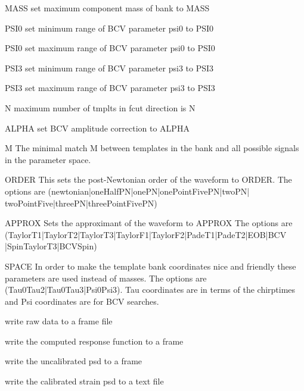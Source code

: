 \begin{entry}
\item[\option{--maximum-mass} \textsc{MASS}] set maximum component mass of bank to MASS
\item[\option{--minimum-psi0} \textsc{ PSI0}] set minimum range of BCV parameter psi0 to PSI0
\item[\option{--maximum-psi0} \textsc{ PSI0}] set maximum range of BCV parameter psi0 to PSI0
\item[\option{--minimum-psi3} \textsc{ PSI3}] set minimum range of BCV parameter psi3 to PSI3
\item[\option{--maximum-psi3} \textsc{ PSI3}] set maximum range of BCV parameter psi3 to PSI3
\item[\option{-maximum-fcut-tmplts} \textsc{ N}] maximum number of tmplts in fcut direction is N
\item[\option{--alpha} \textsc{ ALPHA}] set BCV amplitude correction to ALPHA
\item[\option{--minimal-match} \textsc{ M}] The minimal match M between templates in the 
bank and all possible signals in the parameter space. 
\item[\option{--order} \textsc{ ORDER}] This sets the post-Newtonian order of the waveform to
ORDER.  The options are (newtonian|oneHalfPN|onePN|onePointFivePN|twoPN|
twoPointFive|threePN|threePointFivePN)
\item[\option{--approximant} \textsc{ APPROX}] Sets the approximant of the waveform to APPROX
The options are (TaylorT1|TaylorT2|TaylorT3|TaylorF1|TaylorF2|PadeT1|PadeT2|EOB|BCV
|SpinTaylorT3|BCVSpin)
\item[\option{--space} \textsc{ SPACE}] In order to make the template bank coordinates nice
and friendly these parameters are used instead of masses.  The options are
(Tau0Tau2|Tau0Tau3|Psi0Psi3).  Tau coordinates are in terms of the chirptimes and
Psi coordinates are for BCV searches.
\item[\option{--write-raw-data}] write raw data to a frame file
\item[\option{--write-response}] write the computed response function to a frame
\item[\option{--write-spectrum}] write the uncalibrated psd to a frame
\item[\option{--write-strain-spectrum}] write the calibrated strain psd to a text file
\end{entry}
